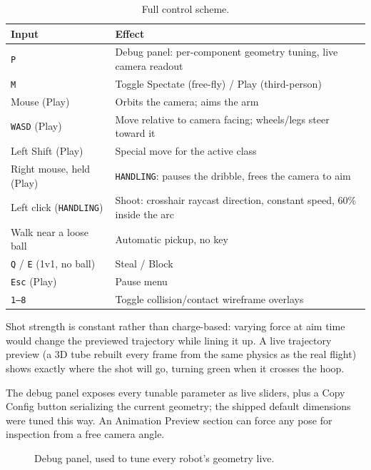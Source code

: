 \documentclass[11pt,a4paper]{article}
\newcommand{\code}[1]{\texttt{#1}}
\newcommand{\figplaceholder}[1]{%
  \fbox{\parbox{0.85\textwidth}{\centering\vspace{1em}\textcolor{red}{TODO: figure. #1}\vspace{1em}}}}
\begin{document}
\begin{table}[htbp]
\centering
\small
\begin{tabularx}{\textwidth}{l X}
\toprule
\textbf{Input} & \textbf{Effect} \\
\midrule
\code{P} & Debug panel: per-component geometry tuning, live camera readout \\
\code{M} & Toggle Spectate (free-fly) / Play (third-person) \\
Mouse (Play) & Orbits the camera; aims the arm \\
\code{WASD} (Play) & Move relative to camera facing; wheels/legs steer toward it \\
Left Shift (Play) & Special move for the active class \\
Right mouse, held (Play) & \code{HANDLING}: pauses the dribble, frees the camera to aim \\
Left click (\code{HANDLING}) & Shoot: crosshair raycast direction, constant speed, 60\% inside the arc \\
Walk near a loose ball & Automatic pickup, no key \\
\code{Q} / \code{E} (1v1, no ball) & Steal / Block \\
\code{Esc} (Play) & Pause menu \\
\code{1--8} & Toggle collision/contact wireframe overlays \\
\bottomrule
\end{tabularx}
\caption{Full control scheme.}
\end{table}

Shot strength is constant rather than charge-based: varying force at aim time would change the previewed trajectory while lining it up. A live trajectory preview (a 3D tube rebuilt every frame from the same physics as the real flight) shows exactly where the shot will go, turning green when it crosses the hoop.

The debug panel exposes every tunable parameter as live sliders, plus a Copy Config button serializing the current geometry; the shipped default dimensions were tuned this way. An Animation Preview section can force any pose for inspection from a free camera angle.

\begin{figure}[htbp]
\centering
\figplaceholder{debug panel open, showing per-component sliders}
\caption{Debug panel, used to tune every robot's geometry live.}
\end{figure}

\end{document}
